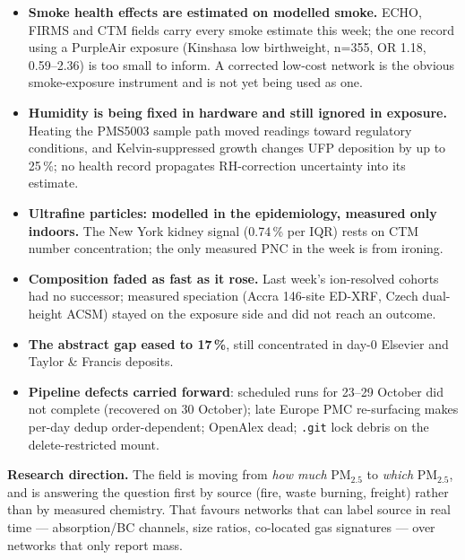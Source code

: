 \documentclass[10pt]{article}
\begin{document}
\footnotesize
\begin{itemize}
\item \textbf{Smoke health effects are estimated on modelled smoke.} ECHO, FIRMS and CTM fields carry every smoke
estimate this week; the one record using a PurpleAir exposure (Kinshasa low birthweight, n=355, OR 1.18,
0.59--2.36) is too small to inform. A corrected low-cost network is the obvious smoke-exposure instrument and is
not yet being used as one.

\item \textbf{Humidity is being fixed in hardware and still ignored in exposure.} Heating the PMS5003 sample path
moved readings toward regulatory conditions, and Kelvin-suppressed growth changes UFP deposition by up to 25\,\%;
no health record propagates RH-correction uncertainty into its estimate.

\item \textbf{Ultrafine particles: modelled in the epidemiology, measured only indoors.} The New York kidney signal
(0.74\,\% per IQR) rests on CTM number concentration; the only measured PNC in the week is from ironing.

\item \textbf{Composition faded as fast as it rose.} Last week's ion-resolved cohorts had no successor; measured
speciation (Accra 146-site ED-XRF, Czech dual-height ACSM) stayed on the exposure side and did not reach an outcome.

\item \textbf{The abstract gap eased to 17\,\%}, still concentrated in day-0 Elsevier and Taylor \& Francis deposits.

\item \textbf{Pipeline defects carried forward}: scheduled runs for 23--29 October did not complete (recovered on
30 October); late Europe PMC re-surfacing makes per-day dedup order-dependent; OpenAlex dead; \texttt{.git} lock
debris on the delete-restricted mount.
\end{itemize}

\vspace{1.5mm}
\textbf{Research direction.} The field is moving from \emph{how much} PM$_{2.5}$ to \emph{which} PM$_{2.5}$, and is
answering the question first by source (fire, waste burning, freight) rather than by measured chemistry. That favours
networks that can label source in real time --- absorption/BC channels, size ratios, co-located gas signatures ---
over networks that only report mass.

\clearpage
\end{document}
